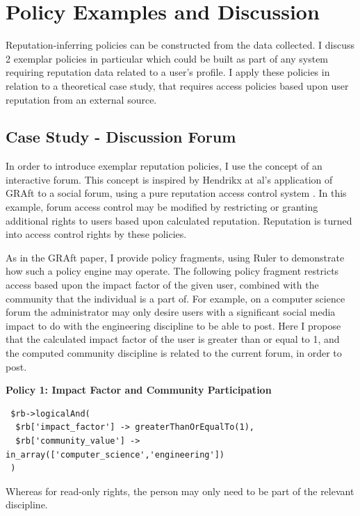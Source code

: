 \section{Policy Examples and Discussion}

Reputation-inferring policies can be constructed from the data collected. I discuss 2 exemplar policies in particular which could be built as part of any system requiring reputation data related to a user's profile. I apply these policies in relation to a theoretical case study, that requires access policies based upon user reputation from an external source. 

\subsection{Case Study - Discussion Forum}

In order to introduce exemplar reputation policies, I use the concept of an interactive forum. This concept is inspired by Hendrikx at al's application of GRAft to a social forum, using a pure reputation access control system \cite{graft_paper}. In this example, forum access control may be modified by restricting or granting additional rights to users based upon calculated reputation. Reputation is turned into access control rights by these policies.

As in the GRAft paper, I provide policy fragments, using Ruler\cite{} to demonstrate how such a policy engine may operate. The following policy fragment restricts access based upon the impact factor of the given user, combined with the community that the individual is a part of. For example, on a computer science forum the administrator may only desire users with a significant social media impact to do with the engineering discipline to be able to post. Here I propose that the calculated impact factor of the user is greater than or equal to 1, and the computed community discipline is related to the current forum, in order to post. 

\begin{center}
 \textbf{Policy 1: Impact Factor and Community Participation}
\begin{verbatim} 
 $rb->logicalAnd(
  $rb['impact_factor'] -> greaterThanOrEqualTo(1),
  $rb['community_value'] -> in_array(['computer_science','engineering'])
 ) 
\end{verbatim}
\end{center}

Whereas for read-only rights, the person may only need to be part of the relevant discipline.


